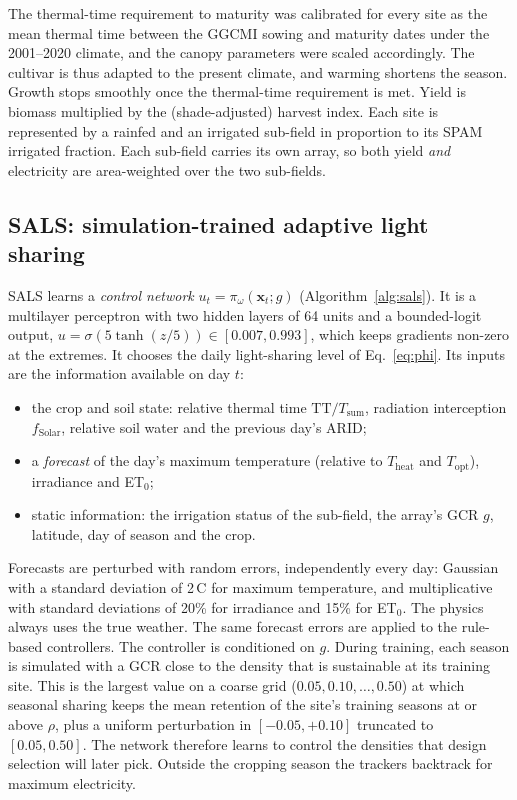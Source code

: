 The thermal-time requirement to maturity was calibrated for every site as the mean thermal time between the GGCMI sowing and maturity dates under the 2001--2020 climate, and the canopy parameters were scaled accordingly. The cultivar is thus adapted to the present climate, and warming shortens the season. Growth stops smoothly once the thermal-time requirement is met. Yield is biomass multiplied by the (shade-adjusted) harvest index. Each site is represented by a rainfed and an irrigated sub-field in proportion to its SPAM irrigated fraction. Each sub-field carries its own array, so both yield \emph{and} electricity are area-weighted over the two sub-fields.

\subsection{SALS: simulation-trained adaptive light sharing}\label{sec:sals}
SALS learns a \emph{control network} $u_t=\pi_\omega(\mathbf{x}_t;g)$ (Algorithm~\ref{alg:sals}). It is a multilayer perceptron with two hidden layers of 64 units and a bounded-logit output, $u=\sigma(5\tanh(z/5))\in[0.007,0.993]$, which keeps gradients non-zero at the extremes. It chooses the daily light-sharing level of Eq.~\eqref{eq:phi}. Its inputs are the information available on day $t$:
\begin{itemize}
\item the crop and soil state: relative thermal time $\mathrm{TT}/T_{\mathrm{sum}}$, radiation interception $f_{\mathrm{Solar}}$, relative soil water and the previous day's ARID;
\item a \emph{forecast} of the day's maximum temperature (relative to $T_{\mathrm{heat}}$ and $T_{\mathrm{opt}}$), irradiance and ET$_0$;
\item static information: the irrigation status of the sub-field, the array's GCR $g$, latitude, day of season and the crop.
\end{itemize}
Forecasts are perturbed with random errors, independently every day: Gaussian with a standard deviation of 2\,\textdegree C for maximum temperature, and multiplicative with standard deviations of 20\% for irradiance and 15\% for ET$_0$. The physics always uses the true weather. The same forecast errors are applied to the rule-based controllers. The controller is conditioned on $g$. During training, each season is simulated with a GCR close to the density that is sustainable at its training site. This is the largest value on a coarse grid ($0.05,0.10,\dots,0.50$) at which seasonal sharing keeps the mean retention of the site's training seasons at or above $\rho$, plus a uniform perturbation in $[-0.05,+0.10]$ truncated to $[0.05,0.50]$. The network therefore learns to control the densities that design selection will later pick. Outside the cropping season the trackers backtrack for maximum electricity.

